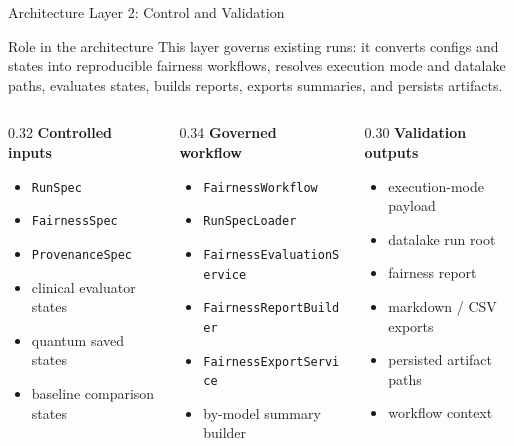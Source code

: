 \documentclass[aspectratio=169,10pt]{beamer}
\begin{document}
\begin{frame}{Architecture Layer 2: Control and Validation}
\small

\begin{block}{Role in the architecture}
This layer governs existing runs: it converts configs and states into reproducible fairness workflows, resolves execution mode and datalake paths, evaluates states, builds reports, exports summaries, and persists artifacts.
\end{block}

\vspace{-0.55em}

\begin{columns}[T]
\begin{column}{0.32\textwidth}
\textbf{\textcolor{phase2green}{Controlled inputs}}
\begin{itemize}
    \item \texttt{RunSpec}
    \item \texttt{FairnessSpec}
    \item \texttt{ProvenanceSpec}
    \item clinical evaluator states
    \item quantum saved states
    \item baseline comparison states
\end{itemize}
\end{column}

\begin{column}{0.34\textwidth}
\textbf{\textcolor{phase2green}{Governed workflow}}
\begin{itemize}
    \item \texttt{FairnessWorkflow}
    \item \texttt{RunSpecLoader}
    \item \texttt{FairnessEvaluationService}
    \item \texttt{FairnessReportBuilder}
    \item \texttt{FairnessExportService}
    \item by-model summary builder
\end{itemize}
\end{column}

\begin{column}{0.30\textwidth}
\textbf{\textcolor{phase2green}{Validation outputs}}
\begin{itemize}
    \item execution-mode payload
    \item datalake run root
    \item fairness report
    \item markdown / CSV exports
    \item persisted artifact paths
    \item workflow context
\end{itemize}
\end{column}
\end{columns}


\end{frame}
\end{document}
